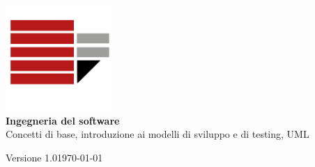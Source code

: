 \documentclass[a4paper,12pt,oneside]{book}
\begin{document}
\begin{titlepage}
    \centering
    
    \includegraphics[width=0.3\textwidth]{assets/logo.png}\\[2cm]
    
    {\huge\bfseries Ingegneria del software}\\[1.5cm]
    
    {\Large Concetti di base, introduzione ai modelli di sviluppo e di testing, UML}\\[2cm]
  
    \vfill
    
    {\large Versione 1.0}\hfill{\large \today}
        
\end{titlepage}

\tableofcontents







\end{document}
